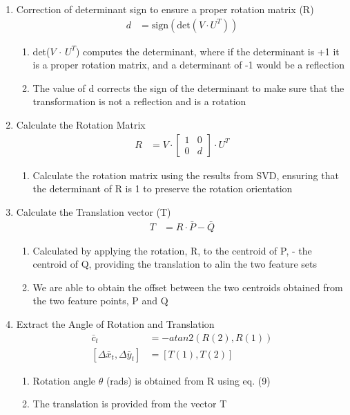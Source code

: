 \begin{enumerate}
\begin{enumerate}
    \end{enumerate}
    \item Correction of determinant sign to ensure a proper rotation matrix (R)
    \begin{align}
        d &= \text{sign}(\text{det}(V \cdot U^T))
    \end{align}
    \begin{enumerate}
        \item det($V$ $\cdot$ $U^T$) computes the determinant, where if the determinant is +1 it is a proper rotation matrix, and a determinant of -1 would be a reflection
        \item The value of d corrects the sign of the determinant to make sure that the transformation is not a reflection and is a rotation
    \end{enumerate}
    \item Calculate the Rotation Matrix
    \begin{align}
        R &= V \cdot \begin{bmatrix}
            1 & 0 \\
            0 & d
        \end{bmatrix} \cdot U^T
    \end{align}
    \begin{enumerate}
        \item Calculate the rotation matrix using the results from SVD, ensuring that the determinant of R is 1 to preserve the rotation orientation
    \end{enumerate}
    \item Calculate the Translation vector (T)
    \begin{align}
        T &= R \cdot \bar{P} - \bar{Q}
    \end{align}
    \begin{enumerate}
        \item Calculated by applying the rotation, R, to the centroid of P, - the centroid of Q, providing the translation to alin the two feature sets
        \item We are able to obtain the offset between the two centroids obtained from the two feature points, P and Q
    \end{enumerate}
    \item Extract the Angle of Rotation and Translation
    \begin{align}
        \bar{c}_t &= -atan2\left(R(2), R(1)\right) \\
        [\Delta\bar{x}_t, \Delta\bar{y}_t] &= [T(1), T(2)]
    \end{align}
    \begin{enumerate}
        \item Rotation angle $\theta$ (rads) is obtained from R using eq. (9)
        \item The translation is provided from the vector T
    \end{enumerate}
\end{enumerate}

